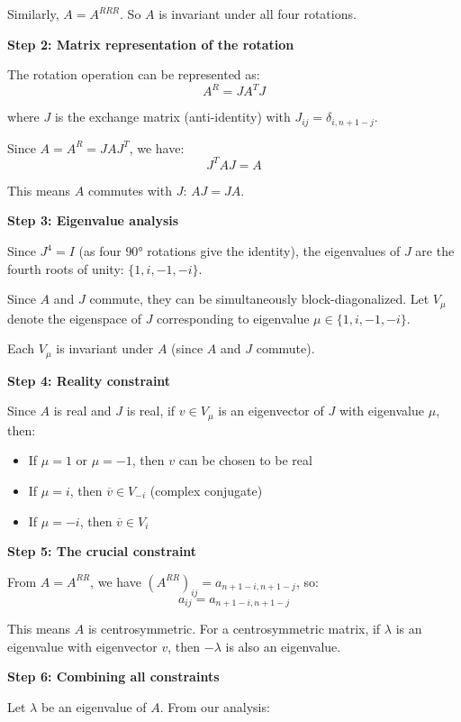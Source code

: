 \documentclass[12pt,a4paper]{article}
\theoremstyle{definition}
\begin{document}
        Similarly, $A = A^{RRR}$. So $A$ is invariant under all four rotations.

        \textbf{Step 2: Matrix representation of the rotation}

        The rotation operation can be represented as:
        $$A^R = J A^T J$$

        where $J$ is the exchange matrix (anti-identity) with $J_{ij} = \delta_{i,n+1-j}$.

        Since $A = A^R = JAJ^T$, we have:
        $$J^T A J = A$$

        This means $A$ commutes with $J$: $AJ = JA$.

        \textbf{Step 3: Eigenvalue analysis}

        Since $J^4 = I$ (as four $90°$ rotations give the identity), the eigenvalues of $J$ are the fourth roots of unity: $\{1, i, -1, -i\}$.

        Since $A$ and $J$ commute, they can be simultaneously block-diagonalized. Let $V_\mu$ denote the eigenspace of $J$ corresponding to eigenvalue $\mu \in \{1, i, -1, -i\}$.

        Each $V_\mu$ is invariant under $A$ (since $A$ and $J$ commute).

        \textbf{Step 4: Reality constraint}

        Since $A$ is real and $J$ is real, if $v \in V_\mu$ is an eigenvector of $J$ with eigenvalue $\mu$, then:
        \begin{itemize}
            \item If $\mu = 1$ or $\mu = -1$, then $v$ can be chosen to be real
            \item If $\mu = i$, then $\overline{v} \in V_{-i}$ (complex conjugate)
            \item If $\mu = -i$, then $\overline{v} \in V_i$
        \end{itemize}

        \textbf{Step 5: The crucial constraint}

        From $A = A^{RR}$, we have $(A^{RR})_{ij} = a_{n+1-i,n+1-j}$, so:
        $$a_{ij} = a_{n+1-i,n+1-j}$$

        This means $A$ is centrosymmetric. For a centrosymmetric matrix, if $\lambda$ is an eigenvalue with eigenvector $v$, then $-\lambda$ is also an eigenvalue.

        \textbf{Step 6: Combining all constraints}

        Let $\lambda$ be an eigenvalue of $A$. From our analysis:
\end{document}
